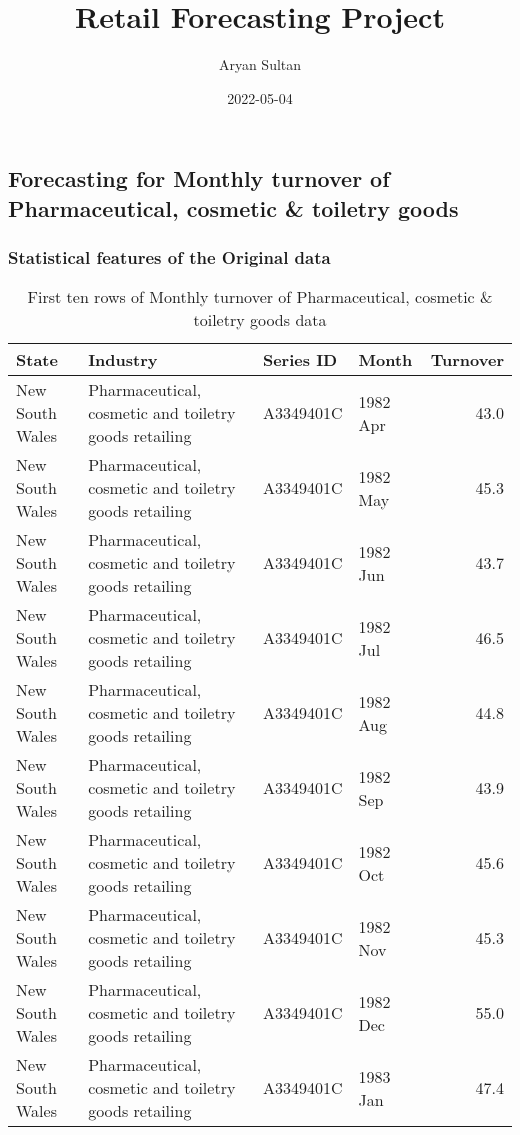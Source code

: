 \documentclass[
]{article}
\title{Retail Forecasting Project}
\author{Aryan Sultan}
\date{2022-05-04}
\begin{document}
\maketitle

\hypertarget{forecasting-for-monthly-turnover-of-pharmaceutical-cosmetic-toiletry-goods}{%
\subsection{Forecasting for Monthly turnover of Pharmaceutical, cosmetic
\& toiletry
goods}\label{forecasting-for-monthly-turnover-of-pharmaceutical-cosmetic-toiletry-goods}}

\hypertarget{statistical-features-of-the-original-data}{%
\subsubsection{Statistical features of the Original
data}\label{statistical-features-of-the-original-data}}

\begin{table}

\caption{\label{tab:loadingData}First ten rows of Monthly turnover of Pharmaceutical, cosmetic & toiletry goods data}
\centering
\begin{tabular}[t]{l|l|l|l|r}
\hline
State & Industry & Series ID & Month & Turnover\\
\hline
New South Wales & Pharmaceutical, cosmetic and toiletry goods retailing & A3349401C & 1982 Apr & 43.0\\
\hline
New South Wales & Pharmaceutical, cosmetic and toiletry goods retailing & A3349401C & 1982 May & 45.3\\
\hline
New South Wales & Pharmaceutical, cosmetic and toiletry goods retailing & A3349401C & 1982 Jun & 43.7\\
\hline
New South Wales & Pharmaceutical, cosmetic and toiletry goods retailing & A3349401C & 1982 Jul & 46.5\\
\hline
New South Wales & Pharmaceutical, cosmetic and toiletry goods retailing & A3349401C & 1982 Aug & 44.8\\
\hline
New South Wales & Pharmaceutical, cosmetic and toiletry goods retailing & A3349401C & 1982 Sep & 43.9\\
\hline
New South Wales & Pharmaceutical, cosmetic and toiletry goods retailing & A3349401C & 1982 Oct & 45.6\\
\hline
New South Wales & Pharmaceutical, cosmetic and toiletry goods retailing & A3349401C & 1982 Nov & 45.3\\
\hline
New South Wales & Pharmaceutical, cosmetic and toiletry goods retailing & A3349401C & 1982 Dec & 55.0\\
\hline
New South Wales & Pharmaceutical, cosmetic and toiletry goods retailing & A3349401C & 1983 Jan & 47.4\\
\hline
\end{tabular}
\end{table}
\end{document}
